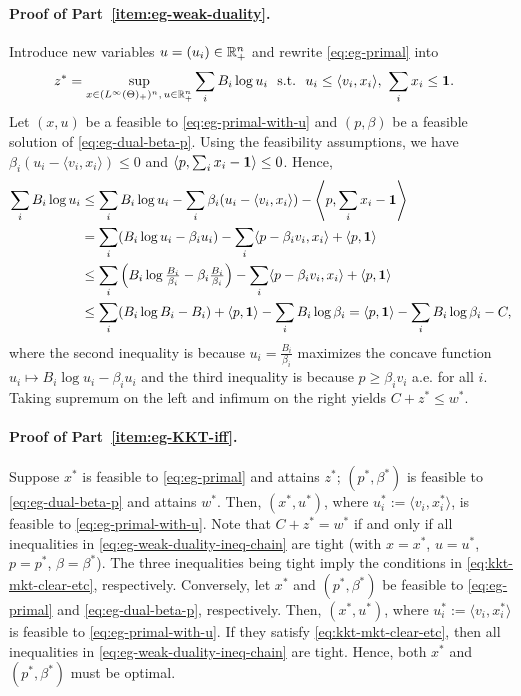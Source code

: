 	\paragraph{Proof of Part~\ref{item:eg-weak-duality}.}
	Introduce new variables $u = (u_i) \in \mathbb{R}_+^n$ and rewrite \eqref{eq:eg-primal} into 
	\begin{align}
			z^* = \sup_{x\in (L^\infty(\Theta)_+)^n,\, u\in \mathbb{R}_+^n}& \sum_i B_i \log u_i\ \
			{\rm s.t.}\  \ u_i \leq \langle v_i, x_i \rangle,\  \sum_i x_i \leq \mathbf{1}. 
		\label{eq:eg-primal-with-u}
	\end{align}
	Let $(x,u)$ be a feasible to \eqref{eq:eg-primal-with-u}
	and $(p, \beta)$ be a feasible solution of \eqref{eq:eg-dual-beta-p}. Using the feasibility assumptions, we have $\beta_i (u_i - \langle v_i, x_i \rangle) \leq 0$ and $\left\langle p, \sum_i x_i - \mathbf{1} \right\rangle \leq 0$. 
	Hence, 
	\begin{align}
		\sum_i B_i \log u_i  
		& \leq \sum_i B_i \log u_i - \sum_i \beta_i (u_i - \langle v_i, x_i\rangle) - \left\langle p, \sum_i x_i - \mathbf{1} \right\rangle \nonumber \\
		& = \sum_i (B_i \log u_i - \beta_i u_i) - \sum_i \langle p - \beta_i v_i, x_i \rangle + \langle p, \mathbf{1} \rangle \nonumber \\
		& \leq \sum_i \left(B_i \log \tfrac{B_i}{\beta_i} - \beta_i \tfrac{B_i}{\beta_i}\right) - \sum_i \langle p - \beta_i v_i, x_i \rangle + \langle p, \mathbf{1} \rangle \nonumber \\
		& \leq \sum_i (B_i \log B_i - B_i) + \langle p, \mathbf{1}\rangle - \sum_i B_i \log \beta_i = \langle p, \mathbf{1}\rangle - \sum_i B_i \log \beta_i - C,
		\label{eq:eg-weak-duality-ineq-chain}
	\end{align}
	where the second inequality is because $u_i = \frac{B_i}{\beta_i}$ maximizes the concave function 
	$ u_i \mapsto B_i \log u_i - \beta_i u_i$
	and the third inequality is because $p \geq \beta_i v_i$ a.e. for all $i$. 
	Taking supremum on the left and infimum on the right yields 
	$ C + z^* \leq w^*$.

	\paragraph{Proof of Part~\ref{item:eg-KKT-iff}.} 
	Suppose $x^*$ is feasible to \eqref{eq:eg-primal} and attains $z^*$; $(p^*, \beta^*)$ is feasible to \eqref{eq:eg-dual-beta-p} and attains $w^*$. 
	Then, $(x^*, u^*)$, where $u^*_i := \langle v_i, x^*_i \rangle$, is feasible to \eqref{eq:eg-primal-with-u}. Note that $C + z^* = w^*$ if and only if all inequalities in \eqref{eq:eg-weak-duality-ineq-chain} are tight (with $x = x^*$, $u = u^*$, $p = p^*$, $\beta = \beta^*$). The three inequalities being tight imply the conditions in \eqref{eq:kkt-mkt-clear-etc}, respectively.
	Conversely, let $x^*$ and $(p^*, \beta^*)$ be feasible to \eqref{eq:eg-primal} and \eqref{eq:eg-dual-beta-p}, respectively. Then, $(x^*, u^*)$, where $u^*_i := \langle v_i, x^*_i \rangle$ is feasible to \eqref{eq:eg-primal-with-u}. 
	If they satisfy \eqref{eq:kkt-mkt-clear-etc}, then all inequalities in \eqref{eq:eg-weak-duality-ineq-chain} are tight. 
	Hence, both $x^*$ and $(p^*, \beta^*)$ must be optimal.

